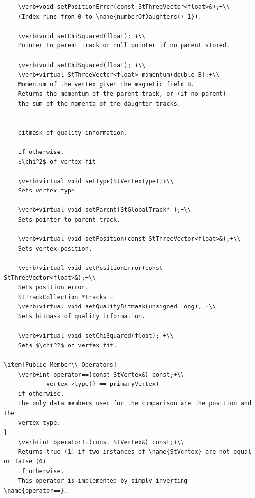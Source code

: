 \begin{enumerate}
\begin{Entry}
\begin{Entry}
{\begin{verbatim}
    \verb+void setPositionError(const StThreeVector<float>&);+\\
    (Index runs from 0 to \name{numberOfDaughters()-1}).
    
    \verb+void setChiSquared(float); +\\    
    Pointer to parent track or null pointer if no parent stored.

    \verb+void setChiSquared(float); +\\
    \verb+virtual StThreeVector<float> momentum(double B);+\\
    Momentum of the vertex given the magnetic field B.
    Returns the momentum of the parent track, or (if no parent)
    the sum of the momenta of the daughter tracks.

       
    bitmask of quality information.

    if otherwise. 
    $\chi^2$ of vertex fit
    
    \verb+virtual void setType(StVertexType);+\\
    Sets vertex type.

    \verb+virtual void setParent(StGlobalTrack* );+\\
    Sets pointer to parent track.

    \verb+virtual void setPosition(const StThreeVector<float>&);+\\
    Sets vertex position.

    \verb+virtual void setPositionError(const StThreeVector<float>&);+\\
    Sets position error.
    StTrackCollection *tracks = 
    \verb+virtual void setQualityBitmask(unsigned long); +\\
    Sets bitmask of quality information.

    \verb+virtual void setChiSquared(float); +\\
    Sets $\chi^2$ of vertex fit.

\item[Public Member\\ Operators]
    \verb+int operator==(const StVertex&) const;+\\
            vertex->type() == primaryVertex)      
    if otherwise.
    The only data members used for the comparison are the position and the
    vertex type.
}  
    \verb+int operator!=(const StVertex&) const;+\\
    Returns true (1) if two instances of \name{StVertex} are not equal or false (0)
    if otherwise.
    This operator is implemented by simply inverting \name{operator==}.


\end{verbatim}}
\end{Entry}
\end{Entry}
\end{enumerate}
